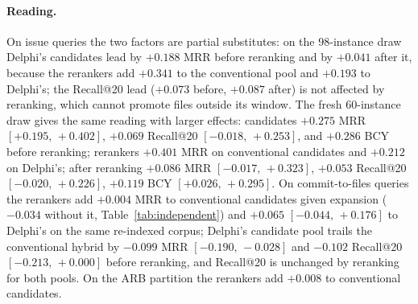 \documentclass{article}
\newcommand{\ci}[2]{{\footnotesize$[#1,\,#2]$}}
\newcommand{\system}{Delphi}
\begin{document}
\begin{table}[h]
\centering
\caption{Factorial cell means. Bold marks the best value per metric within a set.}
\label{tab:factcells}
\footnotesize
\setlength{\tabcolsep}{4pt}

\end{table}

\begin{table}[h]
\centering
\caption{Factorial contrasts: paired differences with repository-cluster bootstrap $95\%$ intervals (20{,}000 resamples, seed 1042); $^{*}$ excludes zero. ``Rerankers'' rows are the conditional effect of adding \system{}'s two rerankers to the named candidates; ``candidates'' rows are the conditional effect of \system{}'s candidate generator against the conventional one at the named reranking level. Recall@20 is unchanged by reranking for conventional candidates by construction (a 30-candidate window reordered into a top 20).}
\label{tab:factcontrasts}
\footnotesize
\setlength{\tabcolsep}{4pt}
\resizebox{\textwidth}{!}{}
\end{table}

\paragraph{Reading.} On issue queries the two factors are partial substitutes: on the 98-instance draw \system{}'s candidates lead by $+0.188$ MRR before reranking and by $+0.041$ after it, because the rerankers add $+0.341$ to the conventional pool and $+0.193$ to \system{}'s; the Recall@20 lead ($+0.073$ before, $+0.087$ after) is not affected by reranking, which cannot promote files outside its window. The fresh 60-instance draw gives the same reading with larger effects: candidates $+0.275$ MRR \ci{+0.195}{+0.402}, $+0.069$ Recall@20 \ci{-0.018}{+0.253}, and $+0.286$ BCY before reranking; rerankers $+0.401$ MRR on conventional candidates and $+0.212$ on \system{}'s; after reranking $+0.086$ MRR \ci{-0.017}{+0.323}, $+0.053$ Recall@20 \ci{-0.020}{+0.226}, $+0.119$ BCY \ci{+0.026}{+0.295}. On commit-to-files queries the rerankers add $+0.004$ MRR to conventional candidates given expansion ($-0.034$ without it, Table~\ref{tab:independent}) and $+0.065$ \ci{-0.044}{+0.176} to \system{}'s on the same re-indexed corpus; \system{}'s candidate pool trails the conventional hybrid by $-0.099$ MRR \ci{-0.190}{-0.028} and $-0.102$ Recall@20 \ci{-0.213}{+0.000} before reranking, and Recall@20 is unchanged by reranking for both pools. On the ARB partition the rerankers add $+0.008$ to conventional candidates.
\end{document}
